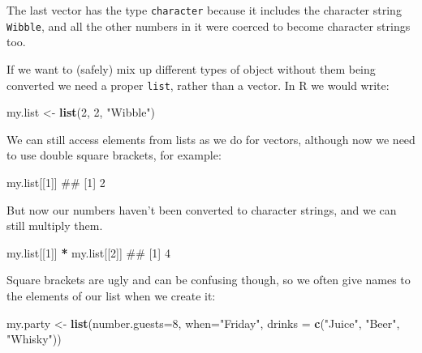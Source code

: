 \documentclass[]{article}
\newenvironment{Shaded}{\begin{snugshade}}{\end{snugshade}}
\newcommand{\KeywordTok}[1]{\textcolor[rgb]{0.13,0.29,0.53}{\textbf{#1}}}
\newcommand{\DataTypeTok}[1]{\textcolor[rgb]{0.13,0.29,0.53}{#1}}
\newcommand{\DecValTok}[1]{\textcolor[rgb]{0.00,0.00,0.81}{#1}}
\newcommand{\StringTok}[1]{\textcolor[rgb]{0.31,0.60,0.02}{#1}}
\newcommand{\OperatorTok}[1]{\textcolor[rgb]{0.81,0.36,0.00}{\textbf{#1}}}
\newcommand{\NormalTok}[1]{#1}
\theoremstyle{definition}
\theoremstyle{definition}
\theoremstyle{definition}
\theoremstyle{remark}
\begin{document}
The last vector has the type \texttt{character} because it includes the
character string \texttt{Wibble}, and all the other numbers in it were
coerced to become character strings too.

If we want to (safely) mix up different types of object without them
being converted we need a proper \texttt{list}, rather than a vector. In
R we would write:

\begin{Shaded}
\begin{Highlighting}[]
\NormalTok{my.list <-}\StringTok{ }\KeywordTok{list}\NormalTok{(}\DecValTok{2}\NormalTok{, }\DecValTok{2}\NormalTok{, }\StringTok{"Wibble"}\NormalTok{)}
\end{Highlighting}
\end{Shaded}

We can still access elements from lists as we do for vectors, although
now we need to use double square brackets, for example:

\begin{Shaded}
\begin{Highlighting}[]
\NormalTok{my.list[[}\DecValTok{1}\NormalTok{]]}
\NormalTok{## [1] 2}
\end{Highlighting}
\end{Shaded}

But now our numbers haven't been converted to character strings, and we
can still multiply them.

\begin{Shaded}
\begin{Highlighting}[]
\NormalTok{my.list[[}\DecValTok{1}\NormalTok{]] }\OperatorTok{*}\StringTok{ }\NormalTok{my.list[[}\DecValTok{2}\NormalTok{]]}
\NormalTok{## [1] 4}
\end{Highlighting}
\end{Shaded}

Square brackets are ugly and can be confusing though, so we often give
names to the elements of our list when we create it:

\begin{Shaded}
\begin{Highlighting}[]
\NormalTok{my.party <-}\StringTok{ }\KeywordTok{list}\NormalTok{(}\DataTypeTok{number.guests=}\DecValTok{8}\NormalTok{, }
                 \DataTypeTok{when=}\StringTok{"Friday"}\NormalTok{, }
                 \DataTypeTok{drinks =} \KeywordTok{c}\NormalTok{(}\StringTok{"Juice"}\NormalTok{, }\StringTok{"Beer"}\NormalTok{, }\StringTok{"Whisky"}\NormalTok{))}
\end{Highlighting}
\end{Shaded}
\end{document}
